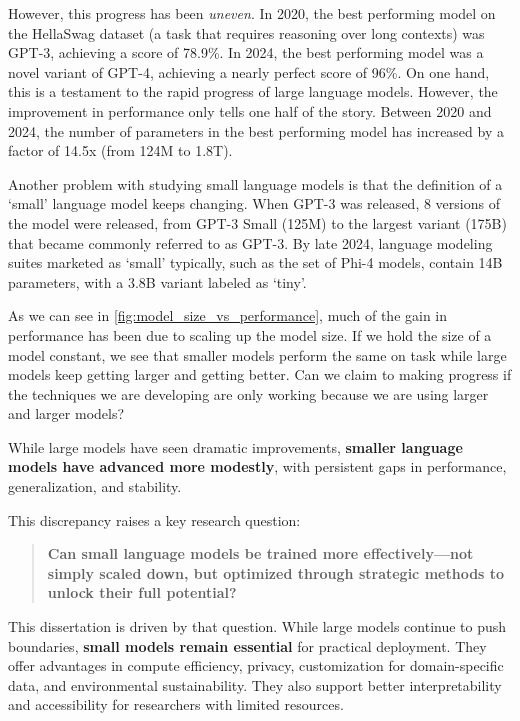 However, this progress has been \emph{uneven}. In 2020, the best performing model on the HellaSwag dataset (a task that requires reasoning over long contexts) was GPT-3, achieving a score of 78.9\%. In 2024, the best performing model was a novel variant of GPT-4, achieving a nearly perfect score of 96\%. On one hand, this is a testament to the rapid progress of large language models. However, the improvement in performance only tells one half of the story. Between 2020 and 2024, the number of parameters in the best performing model has increased by a factor of 14.5x (from 124M to 1.8T). 

Another problem with studying small language models is that the definition of a `small' language model keeps changing. When GPT-3 was released, 8 versions of the model were released, from GPT-3 Small (125M) to the largest variant (175B) that became commonly referred to as GPT-3. By late 2024, language modeling suites marketed as `small' typically, such as the set of Phi-4 models, contain 14B parameters, with a 3.8B variant labeled as `tiny'.


As we can see in \cref{fig:model_size_vs_performance}, much of the gain in performance has been due to scaling up the model size. If we hold the size of a model constant, we see that smaller models perform the same on task while large models keep getting larger and getting better. Can we claim to making progress if the techniques we are developing are only working because we are using larger and larger models?


While large models have seen dramatic improvements, \textbf{smaller language models have advanced more modestly}, with persistent gaps in performance, generalization, and stability. 

This discrepancy raises a key research question:

\begin{quote}
\textbf{Can small language models be trained more effectively—not simply scaled down, but optimized through strategic methods to unlock their full potential?}
\end{quote}


This dissertation is driven by that question. While large models continue to push boundaries, \textbf{small models remain essential} for practical deployment. They offer advantages in compute efficiency, privacy, customization for domain-specific data, and environmental sustainability. They also support better interpretability and accessibility for researchers with limited resources.

